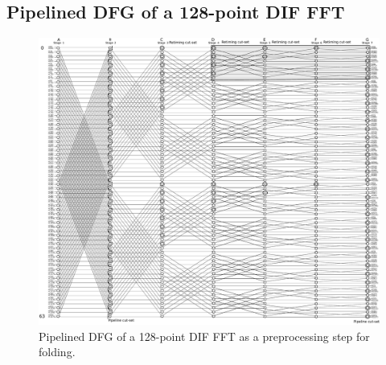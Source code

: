 \documentclass[journal,comsoc]{IEEEtran}
\begin{document}
\subsection{Pipelined DFG of a 128-point DIF FFT\label{sec:appen:pipe_dfg_128}}
\begin{figure}[htbp]
\centering
 \includegraphics[width=\linewidth]{Diagramas/miSeccionFiguras/128puntosRadix8BurbujasPipelined_Kevin.pdf}
\caption{Pipelined DFG of a 128-point DIF FFT as a preprocessing step for folding.}
\label{fig:pipe_dfg_128}
\end{figure}





\newpage


\end{document}
